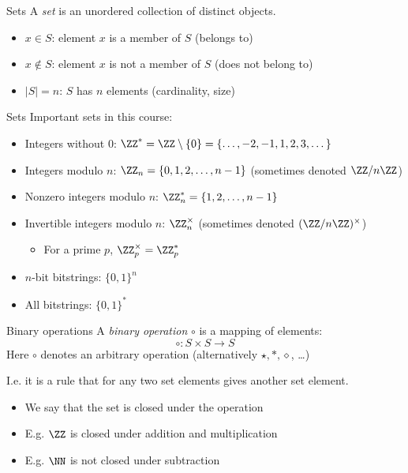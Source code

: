 \begin{frame}{Sets}
  A \emph{set} is an unordered collection of distinct objects.
  \begin{itemize}[<+(1)->]
    \item $x\in S$: element $x$ is a member of $S$ (belongs to)
    \item $x\notin S$: element $x$ is not a member of $S$ (does not belong to)
    \item $\lvert S\rvert=n$: $S$ has $n$ elements (cardinality, size)
  \end{itemize}
\end{frame}

\begin{frame}{Sets}
  Important sets in this course:
  \begin{itemize}[<+(1)->]
    \item Integers without $0$: $\ZZ^*=\ZZ\setminus\{0\}=\{\dots, -2, -1, 1, 2, 3, \dots\}$
    \item Integers modulo $n$: $\ZZ_n = \{0, 1, 2, \dots, n-1\}$ {\scriptsize (sometimes denoted $\ZZ/n\ZZ$)}
    \item Nonzero integers modulo $n$: $\ZZ_n^* = \{1, 2, \dots, n-1\}$
    \item Invertible integers modulo $n$: $\ZZ_n^\times$ {\scriptsize (sometimes denoted $(\ZZ/n\ZZ)^\times$)}
    \par
    \begin{itemize}
      \item For a prime $p$, $\ZZ_p^\times = \ZZ_p^*$ 
    \end{itemize}
    \item $n$-bit bitstrings: $\{0, 1\}^n$
    \item All bitstrings: $\{0, 1\}^*$
  \end{itemize}
\end{frame}

\begin{frame}{Binary operations}
  A \emph{binary operation} $\circ$ is a mapping of elements:
  \[
    \circ: S \times S \to S
  \]
  {\scriptsize Here $\circ$ denotes an arbitrary operation (alternatively $\star, \ast, \diamond$, \dots)}

  \vspace*{1em}

  \pause
  I.e. it is a rule that for any two set elements gives another set element.
  \begin{itemize}[<+(1)->]
    \item We say that the set is \alert{closed} under the operation
    \item E.g. $\ZZ$ is closed under addition and multiplication
    \item E.g. $\NN$ is not closed under subtraction
  \end{itemize}
\end{frame}

